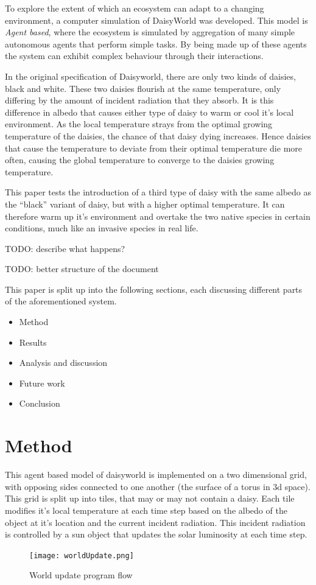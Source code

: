 \documentclass[12pt]{article}
\begin{document}
To explore the extent of which an ecosystem can adapt to a changing
environment, a computer simulation of DaisyWorld\cite{watson1983} was
developed. This model is \emph{Agent based}\cite{gilbert2007}, where
the ecosystem is simulated by aggregation of many simple autonomous
agents that perform simple tasks. By being made up of these agents the
system can exhibit complex behaviour through their interactions.

In the original specification of Daisyworld, there are only
two kinds of daisies, black and white. These two daisies flourish at
the same temperature, only differing by the amount of incident
radiation that they absorb. It is this difference in albedo that
causes either type of daisy to warm or cool it's local environment. As
the local temperature strays from the optimal growing temperature of the
daisies, the chance of that daisy dying increases. Hence daisies that
cause the temperature to deviate from their optimal temperature die more
often, causing the global temperature to converge to the daisies
growing temperature.

This paper tests the introduction of a third type of daisy with the
same albedo as the ``black'' variant of daisy, but with a higher
optimal temperature. It can therefore warm up it's environment and
overtake the two native species in certain conditions, much like an
invasive species in real life.

TODO: describe what happens?

TODO: better structure of the document

This paper is split up into the following sections, each discussing
different parts of the aforementioned system.

\begin{itemize}
\item Method
\item Results
\item Analysis and discussion
\item Future work
\item Conclusion
\end{itemize}

\section{Method}
This agent based model of daisyworld is implemented on a two
dimensional grid, with opposing sides connected to one another (the
surface of a torus in 3d space). This grid is split up into tiles,
that may or may not contain a daisy. Each tile modifies it's local
temperature at each time step based on the albedo of the object at
it's location and the current incident radiation. This incident
radiation is controlled by a sun object that updates the solar
luminosity at each time step.
\begin{figure}[h!]
  \centering
  \texttt{[image: worldUpdate.png]}
  \caption{World update program flow}
  \label{fig:worldUpdate}
\end{figure}
\end{document}
